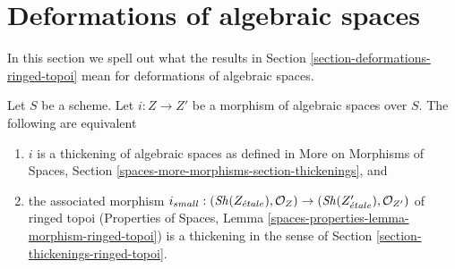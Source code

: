 \section{Deformations of algebraic spaces}
\label{section-deformations-spaces}

\noindent
In this section we spell out what the results in
Section \ref{section-deformations-ringed-topoi}
mean for deformations of algebraic spaces.

\begin{lemma}
\label{lemma-match-thickenings}
Let $S$ be a scheme. Let $i : Z \to Z'$ be a morphism of algebraic spaces
over $S$. The following are equivalent
\begin{enumerate}
\item $i$ is a thickening of algebraic spaces as defined
in More on Morphisms of Spaces, Section
\ref{spaces-more-morphisms-section-thickenings}, and
\item the associated morphism
$i_{small} : (\mathop{\mathit{Sh}}\nolimits(Z_{\acute{e}tale}), \mathcal{O}_Z) \to
(\mathop{\mathit{Sh}}\nolimits(Z'_{\acute{e}tale}), \mathcal{O}_{Z'})$
of ringed topoi (Properties of Spaces, Lemma
\ref{spaces-properties-lemma-morphism-ringed-topoi})
is a thickening in the sense of
Section \ref{section-thickenings-ringed-topoi}.
\end{enumerate}
\end{lemma}

